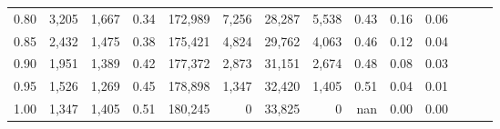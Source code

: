\begin{tabular}{rrrrrrrrrrrrrr}
0.80 &   3,205 &  1,667 &  0.34 &  172,989 &    7,256 &  28,287 &   5,538 &  0.43 &  0.16 &      0.06 \\
0.85 &   2,432 &  1,475 &  0.38 &  175,421 &    4,824 &  29,762 &   4,063 &  0.46 &  0.12 &      0.04 \\
0.90 &   1,951 &  1,389 &  0.42 &  177,372 &    2,873 &  31,151 &   2,674 &  0.48 &  0.08 &      0.03 \\
0.95 &   1,526 &  1,269 &  0.45 &  178,898 &    1,347 &  32,420 &   1,405 &  0.51 &  0.04 &      0.01 \\
1.00 &   1,347 &  1,405 &  0.51 &  180,245 &        0 &  33,825 &       0 &   nan &  0.00 &      0.00 \\
\bottomrule
\end{tabular}
